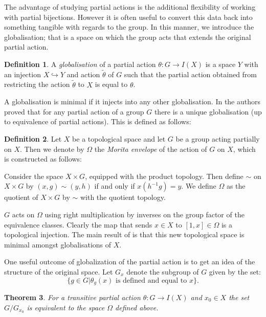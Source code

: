 \documentclass[11pt,a4paper]{amsart}
\theoremstyle{plain}
\newtheorem{theorem}{Theorem}%
\theoremstyle{definition}%
\newtheorem{definition}[theorem]{Definition}%
\theoremstyle{remark}%
\begin{document}
The advantage of studying partial actions is the additional flexibility of working with partial bijections. However it is often useful to convert this data back into something tangible with regards to the group. In this manner, we introduce the globalisation; that is a space on which the group acts that extends the original partial action.

\begin{definition}
A \textit{globalisation} of a partial action $\theta: G \rightarrow I(X)$ is a space $Y$ with an injection $X \hookrightarrow Y$ and action $\tilde{\theta}$ of $G$ such that the partial action obtained from restricting the action $\tilde{\theta}$ to $X$ is equal to $\theta$. 
\end{definition}

A globalisation is minimal if it injects into any other globalisation. In \cite{MR2041539} the authors proved that for any partial action of a group $G$ there is a unique globalisation (up to equivalence of partial actions). This is defined as follows:

\begin{definition}
Let $X$ be a topological space and let $G$ be a group acting partially on $X$. Then we denote by $\Omega$ the \textit{Morita envelope} of the action of $G$ on $X$, which is constructed as follows:

Consider the space $X\times G$, equipped with the product topology. Then define $\sim$ on $X\times G$ by $(x,g)\sim (y,h)$ if and only if $x(h^{-1}g)=y$. We define $\Omega$ as the quotient of $X\times G$ by $\sim$ with the quotient topology. 

$G$ acts on $\Omega$ using right multiplication by inverses on the group factor of the equivalence classes. Clearly the map that sends $x \in X$ to $[1,x] \in \Omega$ is a topological injection. The main result of \cite{MR2041539} is that this new topological space is minimal amongst globalisations of $X$.
\end{definition}

One useful outcome of globalization of the partial action is to get an idea of the structure of the original space. Let $G_{x}$ denote the subgroup of $G$ given by the set:
\begin{equation*}
\lbrace g \in G | \theta_{g}(x) \mbox{ is defined and equal to } x \rbrace.
\end{equation*} 

\begin{theorem}\label{Thm:Free}\cite[Theorem 2.6]{MR2419858}
For a transitive partial action $\theta: G \rightarrow I(X)$ and $x_{0} \in X$ the set $G/ G_{x_{0}}$ is equivalent to the space $\Omega$ defined above.
\end{theorem}
\end{document}
